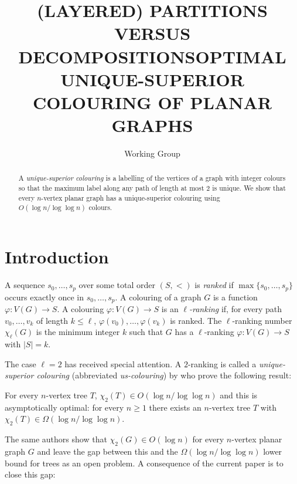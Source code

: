 \documentclass[kpfonts]{patmorin}
\title{\MakeUppercase{(Layered) Partitions versus Decompositions}}
\author{}
\title{\MakeUppercase{Optimal Unique-Superior Colouring of Planar Graphs}}
\author{Working Group}
\newcommand{\uqs}{\chi_2}
\begin{document}
\maketitle

\begin{abstract}
  A \emph{unique-superior colouring} is a labelling of the vertices of a graph with integer colours so that the maximum label along any path of length at most 2 is unique.  We show that every $n$-vertex planar graph has a unique-superior colouring using $O(\log n/\log\log n)$ colours.
\end{abstract}



\section{Introduction}

A sequence $s_0,\ldots,s_p$ over some total order $(S,<)$ is \emph{ranked} if $\max\{s_0,\ldots,s_p\}$ occurs exactly once in $s_0,\ldots,s_p$.  A colouring of a graph $G$ is a function $\varphi:V(G)\to S$.  A colouring $\varphi:V(G)\to S$ is an \emph{$\ell$-ranking} if, for every path $v_0,\ldots,v_k$ of length $k\le\ell$, $\varphi(v_0),\ldots,\varphi(v_k)$ is ranked. The $\ell$-ranking number $\chi_\ell(G)$ is the minimum integer $k$ such that $G$ has a $\ell$-ranking $\varphi:V(G)\to S$ with $|S|=k$.

The case $\ell=2$ has received special attention. A $2$-ranking is called a \emph{unique-superior colouring} (abbreviated \emph{us-colouring}) by \citet{karpas.neiman.ea:on} who prove the following result:

\begin{thm}\label{trees}
    For every $n$-vertex tree $T$, $\uqs(T)\in O(\log n/\log\log n)$ and this is asymptotically optimal: for every $n\ge 1$ there exists an $n$-vertex tree $T$ with $\uqs(T)\in\Omega(\log n/\log\log n)$.
\end{thm}

The same authors show that $\uqs(G)\in O(\log n)$ for every $n$-vertex planar graph $G$ and leave the gap between this and the $\Omega(\log n/\log\log n)$ lower bound for trees as an open problem.  A consequence of the current paper is to close this gap:
\end{document}
